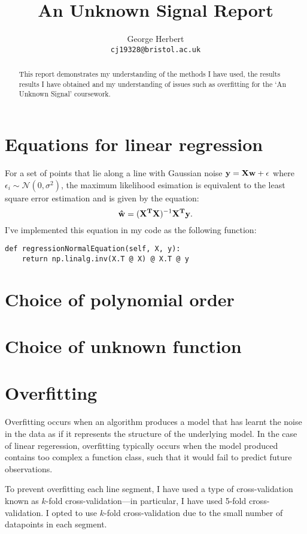 \documentclass[onecolumn, 12pt, a4paper]{article}
\author{
  George Herbert\\
  \texttt{cj19328@bristol.ac.uk}
}
\title{An Unknown Signal Report}
\begin{document}
\maketitle

\begin{abstract}
    This report demonstrates my understanding of the methods I have 
    used, the results results I have obtained and my understanding
    of issues such as overfitting for the `An Unknown Signal'
    coursework.
\end{abstract}

\section{Equations for linear regression}

For a set of points that lie along a line with Gaussian noise 
$\vb{y} = \vb{X}\vb{w} + \vb{\epsilon}$ where $\epsilon_{i} \sim \mathcal{N}(0, \sigma^{2})$,
the maximum likelihood esimation is equivalent to the least square 
error estimation and is given by the equation:
\[
    \vb{\hat{w}} = (\vb{X^{T}}\vb{X})^{-1}\vb{X^{T}}\vb{y}.
\]
I've implemented this equation in my code as the following function:
\begin{verbatim}
def regressionNormalEquation(self, X, y):
    return np.linalg.inv(X.T @ X) @ X.T @ y
\end{verbatim}

\section{Choice of polynomial order}

\section{Choice of unknown function}

\section{Overfitting}

Overfitting occurs when an algorithm produces a model that has
learnt the noise in the data as if it represents the
structure of the underlying model.
In the case of linear regeression, overfitting typically occurs
when the model produced contains too complex a function class,
such that it would fail to predict future observations.

To prevent overfitting each line segment, I have used a type of 
cross-validation known as $k$-fold cross-validation---in particular,
I have used 5-fold cross-validation. 
I opted to use $k$-fold cross-validation due to the small number
of datapoints in each segment.
\end{document}

